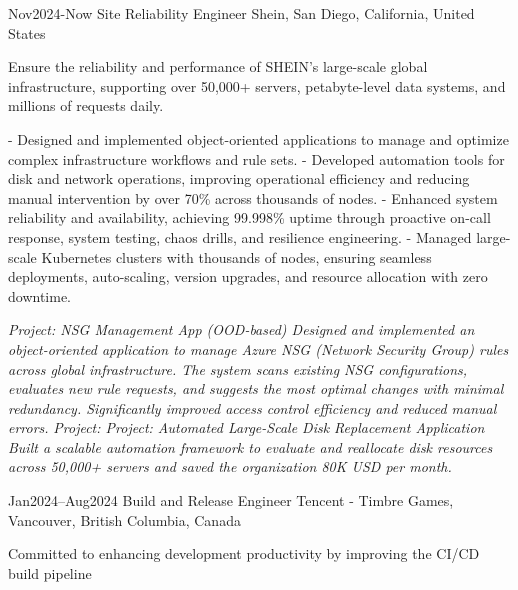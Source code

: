 \documentclass[9pt]{developercv} %
\begin{document}
\begin{entrylist}
	\entry
		{Nov2024-Now}
		{Site Reliability Engineer}
		{Shein, San Diego, California, United States}
		{
            Ensure the reliability and performance of SHEIN’s large-scale global infrastructure, supporting over 50,000+ servers, petabyte-level data systems, and millions of requests daily.\newline

			- Designed and implemented object-oriented applications to manage and optimize complex infrastructure workflows and rule sets.\newline
            - Developed automation tools for disk and network operations, improving operational efficiency and reducing manual intervention by over 70\% across thousands of nodes.\newline
            - Enhanced system reliability and availability, achieving 99.998\% uptime through proactive on-call response, system testing, chaos drills, and resilience engineering.\newline
            - Managed large-scale Kubernetes clusters with thousands of nodes, ensuring seamless deployments, auto-scaling, version upgrades, and resource allocation with zero downtime.\newline

			\textit{Project: NSG Management App (OOD-based)\newline
			Designed and implemented an object-oriented application to manage Azure NSG (Network Security Group) rules across global infrastructure. The system scans existing NSG configurations, evaluates new rule requests, and suggests the most optimal changes with minimal redundancy. Significantly improved access control efficiency and reduced manual errors.\newline}\newline
            \textit{Project: Project: Automated Large-Scale Disk Replacement Application\newline
            Built a scalable automation framework to evaluate and reallocate disk resources across 50,000+ servers and saved the organization 80K USD per month.}\newline\newline
        }
	\entry
		{Jan2024--Aug2024}
		{Build and Release Engineer}
		{Tencent - Timbre Games, Vancouver, British Columbia, Canada}
		{
            Committed to enhancing development productivity by improving the CI/CD build pipeline\newline

}
\end{entrylist}
\end{document}
